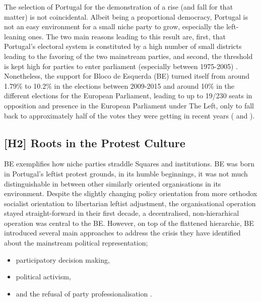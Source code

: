 The selection of Portugal for the demonstration of a rise (and fall for that
matter) is not coincidental. Albeit being a proportional democracy, Portugal
is not an easy environment for a small niche party to grow, especially the left-leaning ones. The two main reasons leading to this result are, first, that
Portugal's electoral system is constituted by a high number of small
districts leading to the favoring of the two mainstream parties, and second,
the threshold is kept high for parties to enter parliament (especially
between 1975-2005) \parencite[see 129]{lisi2009}. Nonetheless, the
support for Bloco de Esquerda (BE) turned itself from around 1.79\% to 10.2\%
in the elections between 2009-2015 and around 10\% in the different elections for the European
Parliament, leading to up to 19/230 seats in opposition and presence in the European Parliament under The Left, only to fall back to approximately half of the votes they were getting in recent years (\cite[see 131]{lisi2009} and \cite{wikipedia2025}).

\subsection{[H2] Roots in the Protest Culture }

BE exemplifies how niche parties straddle Squares and institutions. BE was born in Portugal’s leftist protest grounds, in its humble beginnings, it was not much distinguishable in between other similarly oriented organisations in its environment. Despite the
slightly changing policy orientation from more orthodox socialist orientation
to libertarian leftist adjustment, the organisational operation stayed
straight-forward in their first decade, a decentralised, non-hierarhical
operation was central to the BE. However, on top of the flattened hierarchie,
BE introduced several main approaches to address the crisis they have
identified about the mainstream political representation;



\begin{itemize}
	\item participatory decision making,
	\item political activism,
	\item and the refusal of party professionalisation \parencite[132]{lisi2009}.
\end{itemize}

